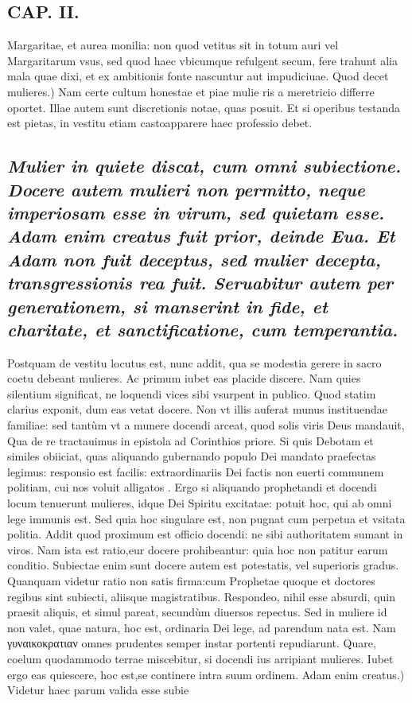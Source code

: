 \documentclass{article}
\begin{document}
\begin{pages}
\section*{CAP. II. }
\marginpar{[ p.27 ]}\pstart Margaritae, et aurea monilia: non quod vetitus sit in totum auri vel Margaritarum vsus, sed quod haec vbicumque refulgent secum, fere trahunt alia mala quae dixi, et ex ambitionis fonte nascuntur aut impudiciuae.  \pend\pstart Quod decet mulieres.) Nam certe cultum honestae et piae mulie ris a meretricio differre oportet. Illae autem sunt discretionis notae, quas posuit. Et si operibus testanda est pietas, in vestitu etiam castoapparere haec professio debet.  \pend
{}
{}
\subsection*{\textit{Mulier in quiete discat, cum omni subiectione. Docere autem mulieri non permitto, neque imperiosam esse in virum, sed quietam esse. Adam enim creatus fuit prior, deinde Eua. Et Adam non fuit deceptus, sed mulier decepta, transgressionis rea fuit. Seruabitur autem per generationem, si manserint in fide, et charitate, et sanctificatione, cum temperantia. }}\pstart Postquam de vestitu locutus est, nunc addit, qua se modestia gerere in sacro coetu debeant mulieres. Ac primum iubet eas placide discere. Nam quies silentium significat, ne loquendi vices sibi vsurpent in publico. Quod statim clarius exponit, dum eas vetat docere. Non vt illis auferat munus instituendae familiae: sed tantùm vt a munere docendi arceat, quod solis viris Deus mandauit, Qua de re tractauimus in epistola ad Corinthios priore. Si quis Debotam et similes obiiciat, quas aliquando gubernando populo Dei mandato praefectas legimus: responsio est facilis: extraordinariis Dei factis non euerti communem politiam, cui nos voluit alligatos . Ergo si aliquando prophetandi et docendi locum tenuerunt mulieres, idque Dei Spiritu excitatae: potuit hoc, qui ab omni lege immunis est. Sed quia hoc singulare est, non pugnat cum perpetua et vsitata politia. Addit quod proximum est officio docendi: ne sibi authoritatem sumant in viros. Nam ista est ratio,eur docere prohibeantur: quia hoc non patitur earum conditio. Subiectae enim sunt docere autem est potestatis, vel superioris gradus. Quanquam videtur ratio non satis firma:cum Prophetae quoque et doctores regibus sint subiecti, aliisque magistratibus. Respondeo, nihil esse absurdi, quin praesit aliquis, et simul pareat, secundùm diuersos repectus. Sed in muliere id non valet, quae natura, hoc est, ordinaria Dei lege, ad parendum nata est. Nam γυναικοκρατιαν omnes prudentes semper instar portenti repudiarunt. Quare, coelum quodammodo terrae miscebitur, si docendi ius arripiant mulieres. Iubet ergo eas quiescere, hoc est,se continere intra suum ordinem.  \pend\pstart Adam enim creatus.) Videtur haec parum valida esse subie\pend

\end{pages}
\end{document}
